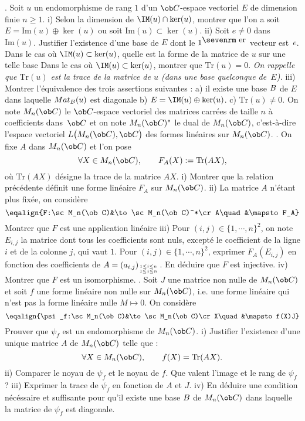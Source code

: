\medskip
{}. Soit $u$ un endomorphisme de rang $1$ d'un $\ob C$-espace vectoriel $E$ de dimension finie $n\ge1$. 
\bigskip
\noindent
i) Selon la dimension de $\IM(u)\cap\ker(u)$, montrer que l'on a soit 
$E=\mbox{Im}(u)\oplus \ker(u)$ ou soit $\mbox{Im}(u)\subset\ker(u)$.
\bigskip
\noindent
ii) Soit $e\neq0$ dans $\mbox{Im}(u)$. Justifier l'existence d'une base de $E$ dont le $1^{\hbox{\sevenrm er}}$ vecteur est~$e$.  \pn
Dans le cas o\`u $\IM(u)\subset\ker(u)$, quelle est la forme de la matrice de $u$ sur une telle base\pn
Dans le cas o\`u $\IM(u)\subset\ker(u)$, montrer que $\mbox{Tr}(u)=0$. \pn  
{\it On rappelle que $\mbox{Tr}(u)$ est la trace de la matrice de $u$ (dans une base quelconque de~$E$).} 
\bigskip
\noindent
iii) Montrer l'\'equivalence des trois assertions suivantes : \medskip\noindent
a) il existe une base $\sc B$ de $E$ dans laquelle $\sc Mat_{\sc B}(u)$ est diagonale\smallskip\noindent
b) $E=\IM(u)\oplus\ker(u)$. \smallskip\noindent
c) $\mbox{Tr}(u)\neq0$. 
\bigskip\noindent
On note $\sc M_n(\ob C)$ le $\ob C$-espace vectoriel des matrices carr\'ees de taille $n$ \`a coefficients dans~$\ob C$ et  on note $\sc M_n(\ob C)^*$ le dual de $\sc M_n(\ob C)$, c'est-\`a-dire l'espace vectoriel   $\sc L\big(\sc M_n(\ob C), \ob C\big)$ des formes lin\'eaires sur $\sc M_n(\ob C)$.  \bigskip
{}. On fixe $A$ dans $\sc M_n(\ob C)$ et l'on pose 
$$
\forall X\in\sc M_n(\ob C), \qquad F_A(X):=\mbox{Tr}(AX), 
$$
o\`u $\mbox{Tr}(AX)$ d\'esigne la trace de la matrice $AX$. 
\bigskip
\noindent
i) Montrer que la relation pr\'ec\'edente d\'efinit une forme lin\'eaire $F_A$ sur $\sc M_n(\ob C)$. \bigskip
\noindent
ii) La matrice $A$ n'\'etant plus fix\'ee, on consid\`ere 
$$
\eqalign{F:\sc M_n(\ob C)&\to\sc M_n(\ob C)^*\cr A\quad &\mapsto F_A}
$$
Montrer que $F$ est une application lin\'eaire
\bigskip
\noindent
iii) Pour $(i,j)\in\{1, \cdots, n\}^2$, on note $E_{i,j}$ la matrice dont tous les coefficients sont nuls, except\'e le coefficient de la ligne $i$ et de la colonne $j$, qui vaut $1$. 
\bigskip
\noindent
Pour $(i,j)\in\{1, \cdots, n\}^2$, exprimer $F_A(E_{i,j})$ en fonction des coefficients de $A=(a_{i,j})_{1\le i\le n\atop1\le j\le n}$. \pn En d\'eduire que $F$ est injective. 
\bigskip
\noindent
iv) Montrer que $F$ est un isomorphisme. 
\bigskip
{}. Soit $J$ une matrice non nulle de $\sc M_n(\ob C)$ et soit $f$ une forme lin\'eaire non nulle sur $\sc M_n(\ob C)$, i.e. une forme lin\'eaire qui n'est pas la forme lin\'eaire nulle $M\mapsto0$. 
On consid\`ere 
$$
\eqalign{\psi_f:\sc M_n(\ob C)&\to\sc M_n(\ob C)\cr
X\quad&\mapsto f(X)J}
$$
Prouver que $\psi_f$ est un endomorphisme de $\sc M_n(\ob C)$. \bigskip
\noindent
i) Justifier l'existence d'une unique matrice $A$ de $\sc M_n(\ob C)$ telle que : 
$$
\forall X\in\sc M_n(\ob C), \qquad f(X)=\mbox{Tr}(AX).
$$
ii) Comparer le noyau de $\psi_f$ et le noyau de $f$. Que valent l'image et le rang de $\psi_f$ ? 
\bigskip
\noindent
iii) Exprimer la trace de $\psi_f$ en fonction de $A$ et $J$. \bigskip
\noindent
iv) En d\'eduire une condition n\'ec\'essaire et suffisante pour qu'il existe une base $\sc B$ de $\sc M_n(\ob C)$ dans laquelle la matrice de $\psi_f$ est diagonale. 
\bigskip
